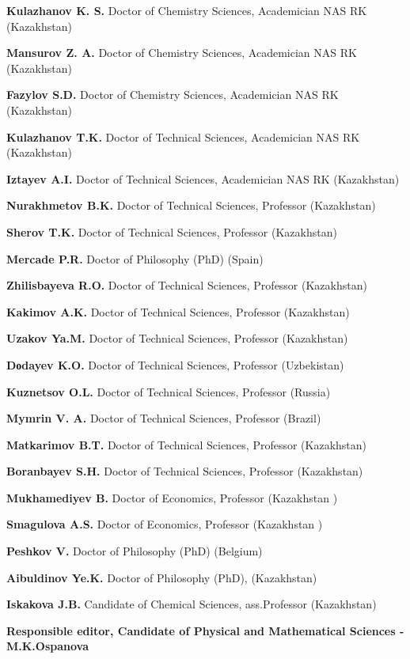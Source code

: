 \textbf{Kulazhanov K. S.} Doctor of Chemistry Sciences, Academician NAS
RK (Kazakhstan)

\textbf{Mansurov Z. A.} Doctor of Chemistry Sciences, Academician NAS RK
(Kazakhstan)

\textbf{Fazylov S.D.} Doctor of Chemistry Sciences, Academician NAS RK
(Kazakhstan)

\textbf{Kulazhanov T.K.} Doctor of Technical Sciences, Academician NAS
RK (Kazakhstan)

\textbf{Iztayev A.I.} Doctor of Technical Sciences, Academician NAS RK
(Kazakhstan)

\textbf{Nurakhmetov B.K.} Doctor of Technical Sciences, Professor
(Kazakhstan)

\textbf{Sherov T.K.} Doctor of Technical Sciences, Professor
(Kazakhstan)

\textbf{Mercade P.R.} Doctor of Philosophy (PhD) (Spain)

\textbf{Zhilisbayeva R.O.} Doctor of Technical Sciences, Professor
(Kazakhstan)

\textbf{Kakimov A.K.} Doctor of Technical Sciences, Professor
(Kazakhstan)

\textbf{Uzakov Ya.M.} Doctor of Technical Sciences, Professor
(Kazakhstan)

\textbf{Dоdayev K.O.} Doctor of Technical Sciences, Professor
(Uzbekistan)

\textbf{Kuznetsov O.L.} Doctor of Technical Sciences, Professor (Russia)

\textbf{Mymrin V. A.} Doctor of Technical Sciences, Professor (Brazil)

\textbf{Matkarimov B.T.} Doctor of Technical Sciences, Professor
(Kazakhstan)

\textbf{Boranbayev S.H.} Doctor of Technical Sciences, Professor
(Kazakhstan)

\textbf{Mukhamediyev B.} Doctor of Economics, Professor (Kazakhstan )

\textbf{Smagulova A.S.} Doctor of Economics, Professor (Kazakhstan )

\textbf{Peshkov V.} Doctor of Philosophy (PhD) (Belgium)

\textbf{Aibuldinov Ye.K.} Doctor of Philosophy (PhD), (Kazakhstan)

\textbf{Iskakova J.B.} Candidate of Chemical Sciences, ass.Professor
(Kazakhstan)

\begin{center}
\textbf{Responsible editor, Candidate of Physical and Mathematical
Sciences -M.K.Ospanova}
\end{center}

